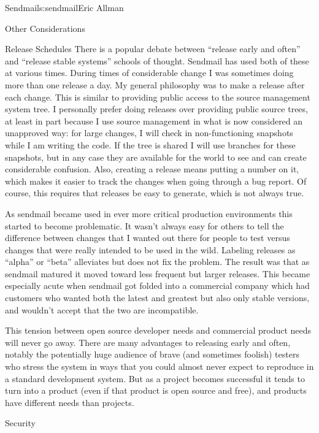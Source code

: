 \begin{aosachapter}{Sendmail}{s:sendmail}{Eric Allman}
\begin{aosasect1}{Other Considerations}
\begin{aosasect2}{Release Schedules}
There is a popular debate between ``release early and often'' and
``release stable systems'' schools of thought. Sendmail has used both
of these at various times. During times of considerable change I was
sometimes doing more than one release a day. My general philosophy was
to make a release after each change. This is similar to providing
public access to the source management system tree. I personally
prefer doing releases over providing public source trees, at least in
part because I use source management in what is now considered an
unapproved way: for large changes, I will check in non-functioning
snapshots while I am writing the code. If the tree is shared I will
use branches for these snapshots, but in any case they are available
for the world to see and can create considerable confusion. Also,
creating a release means putting a number on it, which makes it easier
to track the changes when going through a bug report.
Of course, this requires that releases be easy to generate,
which is not always true.

As sendmail became used in ever more critical production environments
this started to become problematic. It wasn't always easy for others
to tell the difference between changes that I wanted out there for
people to test versus changes that were really intended to be used in
the wild. Labeling releases as ``alpha'' or ``beta'' alleviates but
does not fix the problem. The result was that as sendmail matured it
moved toward less frequent but larger releases. This became especially
acute when sendmail got folded into a commercial company which had
customers who wanted both the latest and greatest but also only stable
versions, and wouldn't accept that the two are incompatible.

This tension between open source developer needs and commercial
product needs will never go away. There are many advantages to
releasing early and often, notably the potentially huge audience of
brave (and sometimes foolish) testers who stress the system in ways
that you could almost never expect to reproduce in a standard
development system. But as a project becomes successful it tends to
turn into a product (even if that product is open source and free),
and products have different needs than projects.

\end{aosasect2}

\end{aosasect1}

\begin{aosasect1}{Security}


\end{aosasect1}
\end{aosachapter}
